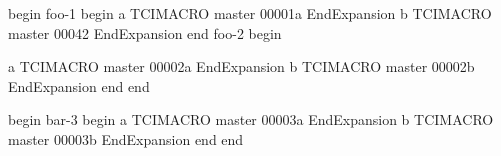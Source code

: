 begin
foo-1
begin
a
TCIMACRO
master 00001a
EndExpansion
b
TCIMACRO
master 00042
EndExpansion
end
foo-2
begin

a
TCIMACRO
master 00002a
EndExpansion
b
TCIMACRO
master 00002b
EndExpansion
end
end

begin
bar-3
begin
a
TCIMACRO
master 00003a
EndExpansion
b
TCIMACRO
master 00003b
EndExpansion
end
end
